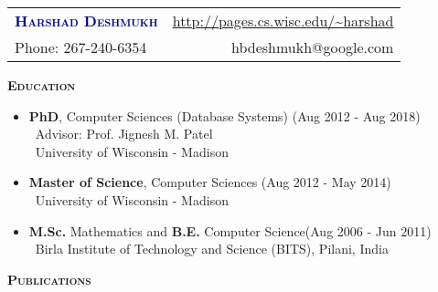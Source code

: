 \documentclass[11pt]{article}
\newcommand{\graybox}[1]{\begin{mdframed}[backgroundcolor=light-gray, linecolor=light-gray, roundcorner=10pt, shadow=false, shadowsize=1pt]
\Large{\textbf{\textsc{#1}}}
\end{mdframed}}
\begin{document}
\begin{flushleft}
\begin{tabular*}{\textwidth}{@{\extracolsep{\fill}}lr}%
{\LARGE{\textcolor{darkblue}{\textbf{\textsc{Harshad Deshmukh}}}}} & \url{http://pages.cs.wisc.edu/~harshad}\\
Phone: 267-240-6354 & hbdeshmukh@google.com
\end{tabular*}
\end{flushleft}
\graybox{Education}
\begin{itemize}\addtolength{\itemsep}{-0.5\baselineskip}
\item{\textbf{PhD}, Computer Sciences (Database Systems) \hfill (Aug 2012 - Aug 2018) }\\
	\textendash\ Advisor: Prof. Jignesh M. Patel\\
	\textendash\ University of Wisconsin - Madison
\item{\textbf{Master of Science}, Computer Sciences \hfill (Aug 2012 - May 2014) }\\
	\textendash\ University of Wisconsin - Madison
\item{\textbf{M.Sc.} Mathematics and \textbf{B.E.} Computer Science\hfill (Aug 2006 - Jun 2011) }\\
	\textendash\ Birla Institute of Technology and Science (BITS), Pilani, India
\end{itemize}
\graybox{Publications}
\end{document}
